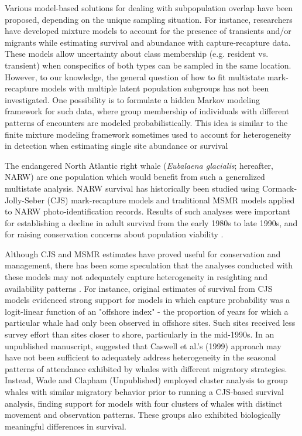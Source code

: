 \documentclass[times,mee,doublespace,]{besauth2}
\begin{document}
Various model-based solutions for dealing with subpopulation overlap have been proposed, depending on the unique sampling situation.  For instance, researchers have developed mixture models to account for the presence of transients and/or migrants while estimating survival \citep{PradelEtAl1997,FiebergConn2014} and abundance \citep{ConnEtAl2011} with capture-recapture data. These models allow uncertainty about class membership (e.g. resident vs. transient) when conspecifics of both types can be sampled in the same location.  However, to our knowledge, the general question of how to fit multistate mark-recapture models with multiple latent population subgroups has not been investigated.  One possibility is to formulate a hidden Markov modeling framework for such data, where group membership of individuals with different patterns of encounters are modeled probabilistically. This idea is similar to the finite mixture modeling framework sometimes used to account for heterogeneity in detection when estimating single site abundance or survival \citep[cf.][]{Pledger2000,PledgerEtAl2003,PledgerEtAl2010}

The endangered North Atlantic right whale (\textit{Eubalaena glacialis}; hereafter, NARW) are one population which would benefit from such a generalized multistate analysis. NARW survival has historically been studied using Cormack-Jolly-Seber (CJS) mark-recapture models \citep{CaswellEtAl1999} and traditional MSMR models \citep{FujiwaraCaswell2002,FujiwaraCaswell2002b} applied to NARW photo-identification records.  Results of such analyses were important for establishing a decline in adult survival from the early 1980s to late 1990s, and for raising conservation concerns about population viability \citep{CaswellEtAl1999,FujiwaraCaswell2001}.

Although CJS and MSMR estimates have proved useful for conservation and management, there has been some speculation that the analyses conducted with these models may not adequately capture heterogeneity in resighting and availability patterns \citep{ClaphamEtAl2002}.  For instance, original estimates of survival from CJS models \citep{CaswellEtAl1999} evidenced strong support for models in which capture probability was a logit-linear function of an "offshore index" - the proportion of years for which a particular whale had only been observed in offshore sites.  Such sites received less survey effort than sites closer to shore, particularly in the mid-1990s.  In an unpublished manuscript, \citet{WadeClaphamUnpublished} suggested that Caswell et al.'s (1999) approach may have not been sufficient to adequately address heterogeneity in the seasonal patterns of attendance exhibited by whales with different migratory strategies.  Instead, Wade and Clapham (Unpublished) employed cluster analysis to group whales with similar migratory behavior prior to running a CJS-based survival analysis, finding support for models with four clusters of whales with distinct movement and observation patterns.  These groups also exhibited biologically meaningful differences in survival.
\end{document}
